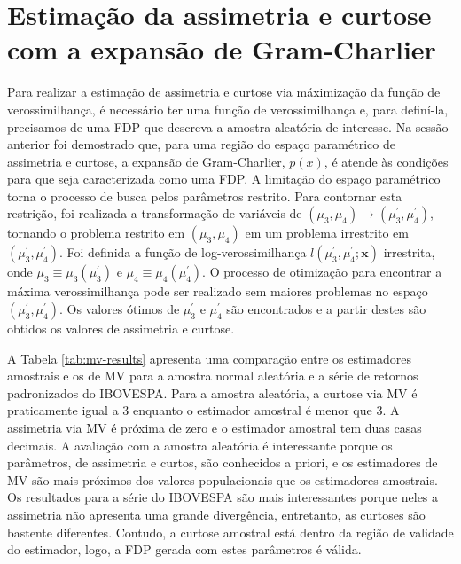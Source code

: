 \documentclass[]{article}
\begin{document}
\section{Estimação da assimetria e curtose com a expansão de
Gram-Charlier}\label{estimacao-da-assimetria-e-curtose-com-a-expansao-de-gram-charlier}

Para realizar a estimação de assimetria e curtose via máximização da
função de verossimilhança, é necessário ter uma função de
verossimilhança e, para definí-la, precisamos de uma FDP que descreva a
amostra aleatória de interesse. Na sessão anterior foi demostrado que,
para uma região do espaço paramétrico de assimetria e curtose, a
expansão de Gram-Charlier, \(p(x)\), é atende às condições para que seja
caracterizada como uma FDP. A limitação do espaço paramétrico torna o
processo de busca pelos parâmetros restrito. Para contornar esta
restrição, foi realizada a transformação de variáveis de
\((\mu_3, \mu_4) \rightarrow (\mu_3^\prime, \mu_4^\prime)\), tornando o
problema restrito em \((\mu_3, \mu_4)\) em um problema irrestrito em
\((\mu_3^\prime, \mu_4^\prime)\). Foi definida a função de
log-verossimilhança \(l(\mu_3^\prime, \mu_4^\prime; \mathbf{x})\)
irrestrita, onde \(\mu_3 \equiv \mu_3(\mu_3^\prime)\) e
\(\mu_4 \equiv \mu_4(\mu_4^\prime)\). O processo de otimização para
encontrar a máxima verossimilhança pode ser realizado sem maiores
problemas no espaço \((\mu_3^\prime, \mu_4^\prime)\). Os valores ótimos
de \(\mu_3^\prime\) e \(\mu_4^\prime\) são encontrados e a partir destes
são obtidos os valores de assimetria e curtose.

A Tabela \ref{tab:mv-results} apresenta uma comparação entre os
estimadores amostrais e os de MV para a amostra normal aleatória e a
série de retornos padronizados do IBOVESPA. Para a amostra aleatória, a
curtose via MV é praticamente igual a 3 enquanto o estimador amostral é
menor que 3. A assimetria via MV é próxima de zero e o estimador
amostral tem duas casas decimais. A avaliação com a amostra aleatória é
interessante porque os parâmetros, de assimetria e curtos, são
conhecidos a priori, e os estimadores de MV são mais próximos dos
valores populacionais que os estimadores amostrais. Os resultados para a
série do IBOVESPA são mais interessantes porque neles a assimetria não
apresenta uma grande divergência, entretanto, as curtoses são bastente
diferentes. Contudo, a curtose amostral está dentro da região de
validade do estimador, logo, a FDP gerada com estes parâmetros é válida.
\end{document}

